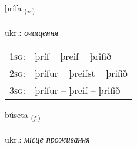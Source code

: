 \documentclass[frontgrid, backgrid]{flacards}\usepackage[]{graphicx}\usepackage[]{xcolor}
\begin{document}
\renewcommand{\flhead}{\vskip5pt \fboxsep=0pt {\small\bfseries\footnotesize Sagnorð | дієслово}}
\renewcommand{\fcfoot}{\vskip5pt \fboxsep=0pt \hspace{2pt}{\small\bfseries\footnotesize 3K}}

\renewcommand{\blhead}{\vskip5pt {\small\bfseries\footnotesize Sagnorð | дієслово }}
\renewcommand{\bcfoot}{\vskip5pt \hspace{2pt}{\small\bfseries\footnotesize 3K}}


{þrífa \small{\textsubscript{(\textit{v.})}} \\[1ex] %
\textphonetic{[θriːva]} \\
ukr.: \emph{очищення} \\  [2ex]
\renewcommand*{\arraystretch}{0.8}
\begin{tabular}{p{1cm}l}
\textsc{1sg}: & þríf -- þreif -- þrifið \\ 
\textsc{2sg}: & þrífur -- þreifst -- þrifið \\ 
\textsc{3sg}: & þrífur -- þreif -- þrifið \\ 
\end{tabular}
}

\renewcommand{\flhead}{\vskip5pt \fboxsep=0pt {\small\bfseries\footnotesize Nafnorð | іменник}}
\renewcommand{\fcfoot}{\vskip5pt \fboxsep=0pt \hspace{2pt}{\small\bfseries\footnotesize 3K}}

\renewcommand{\blhead}{\vskip5pt {\small\bfseries\footnotesize Nafnorð | іменник }}
\renewcommand{\bcfoot}{\vskip5pt \hspace{2pt}{\small\bfseries\footnotesize 3K}}


{búseta \small{\textsubscript{(\textit{f.})}} \\[1ex] %
\textphonetic{[puːsɛta]} \\
ukr.: \emph{місце проживання} \\  [2ex]
\renewcommand*{\arraystretch}{0.8}
}
\end{document}
